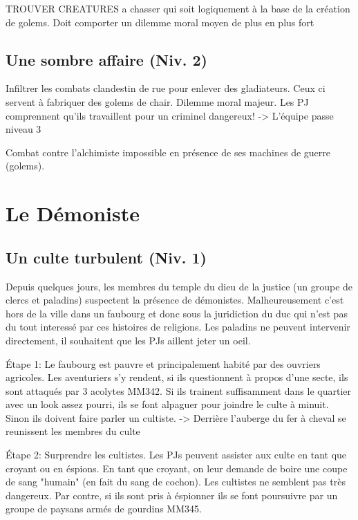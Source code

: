 TROUVER CREATURES a chasser qui soit logiquement à la base de la création de golems. Doit comporter
un dilemme moral moyen de plus en plus fort

\subsection{Une sombre affaire (Niv. 2)}

Infiltrer les combats clandestin de rue pour enlever des gladiateurs. Ceux ci servent à fabriquer
des golems de chair. Dilemme moral majeur. Les PJ comprennent qu'ils travaillent pour un criminel
dangereux!
 -> L'équipe passe niveau 3

Combat contre l'alchimiste impossible en présence de ses machines de guerre (golems).

\section{Le Démoniste}

\subsection{Un culte turbulent (Niv. 1)}

Depuis quelques jours, les membres du temple du dieu de la justice (un groupe de clercs et paladins) 
suspectent la présence de démonistes. Malheureusement c'est hors de la ville dans un faubourg 
et donc sous la juridiction du duc qui n'est pas du tout interessé par ces histoires de religions.
Les paladins ne peuvent intervenir directement, il souhaitent que les PJs aillent jeter un oeil.

Étape 1: Le faubourg est pauvre et principalement habité par des ouvriers agricoles. Les aventuriers
s'y rendent, si ils questionnent à propos d'une secte, ils sont attaqués par 3 acolytes MM342. Si ils
trainent suffisamment dans le quartier avec un look assez pourri, ils se font alpaguer pour joindre le 
culte à minuit. Sinon ils doivent faire parler un cultiste.
-> Derrière l'auberge du fer à cheval se reunissent les membres du culte

Étape 2: Surprendre les cultistes. Les PJs peuvent assister aux culte en tant que croyant ou en éspions.
En tant que croyant, on leur demande de boire une coupe de sang "humain" (en fait du sang de cochon).
Les cultistes ne semblent pas très dangereux. Par contre, si ils sont pris à éspionner ils se font 
poursuivre par un groupe de paysans armés de gourdins MM345.

